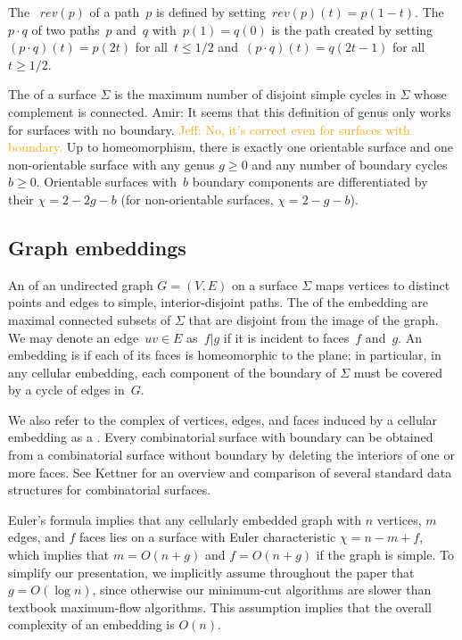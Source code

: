 \documentclass[letterpaper,review]{siamart190516}
\def\rev{\mathit{rev}}
\def\anote#1{\color{purple}Amir: #1 \color{black}}
\def\jnote#1{\textcolor{orange}{Jeff: #1}}
\begin{document}
The ~$\rev(p)$ of a path~$p$ is defined by
setting~$\rev(p)(t) = p(1-t)$. The ~$p \cdot q$ of two
paths~$p$ and~$q$ with~$p(1)=q(0)$ is the path created by
setting~$(p\cdot q)(t) = p(2t)$ for all~$t \leq 1/2$
and~$(p\cdot q)(t) = q(2t-1)$ for all~$t \geq 1/2$.

The  of a surface $\Sigma$ is the maximum number of disjoint simple cycles in $\Sigma$ whose complement is connected.
\anote{It seems that this definition of genus only works for surfaces with no boundary.}\jnote{No, it’s correct even for surfaces with boundary.}
 Up to homeomorphism,
there is exactly one orientable surface and one non-orientable surface with any genus $g\ge 0$ and any number of
boundary cycles $b\ge 0$.
Orientable surfaces with~$b$ boundary components are differentiated by their  ${\chi = 2 - 2g - b}$ (for non-orientable surfaces, ${\chi = 2 - g - b}$).


\subsection{Graph embeddings}
\label{SS:embeddings}


An  of an undirected graph $G=(V,E)$ on a surface $\Sigma$ maps vertices to distinct points and edges to simple, interior-disjoint paths.  The  of the embedding are maximal connected subsets of $\Sigma$ that are disjoint from the image of the graph.
We may denote an edge~$uv \in E$ as~$f | g$ if it is incident to faces~$f$ and~$g$.
An embedding is  if each of its faces is homeomorphic to the plane; in particular, in any cellular embedding, each component of the boundary of $\Sigma$ must be covered by a cycle of edges in~$G$.  

We also refer to the complex of vertices, edges, and faces induced by a cellular embedding as a .  Every combinatorial surface with boundary can be obtained from a combinatorial surface without boundary by deleting the interiors of one or more faces.  See Kettner \cite{k-ugpdd-99} for an overview and comparison of several standard data structures for combinatorial surfaces. 

Euler's formula implies that any cellularly embedded graph with $n$ vertices, $m$ edges, and $f$ faces lies on a surface with Euler characteristic $\chi = n-m+f$, which implies that $m = O(n+g)$ and $f=O(n+g)$ if the graph is simple.
To simplify our presentation, we implicitly assume throughout the paper that $g = O(\log n)$, since otherwise our minimum-cut algorithms are slower than textbook maximum-flow algorithms.  This assumption implies that the overall complexity of an embedding is $O(n)$.
\end{document}
